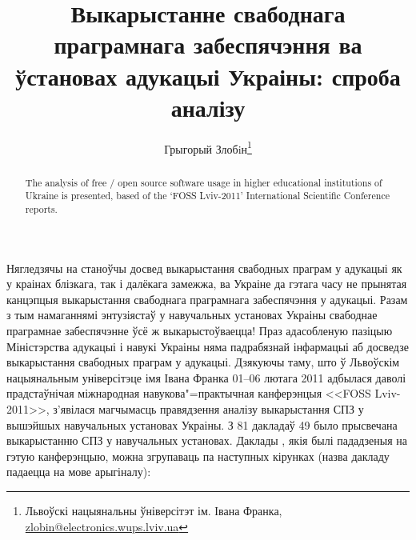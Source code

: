 \documentclass[10pt, a5paper]{article}
\begin{document}
\renewcommand{\figurename}{Рыс.} %
\renewcommand{\abstractname}{Анатацыя}
\renewcommand{\refname}{Літаратура}

\title{Выкарыстанне свабоднага праграмнага забеспячэння ва ўстановах адукацыі Украіны: спроба аналізу}

\author{Грыгорый Злобiн\footnote{Львоўскі нацыянальны ўніверсітэт ім. Івана Франка, \url{zlobin@electronics.wups.lviv.ua}}}
\date{}

\maketitle

\begin{abstract}
The analysis of free / open source software usage in higher educational institutions of Ukraine is presented, based of the `FOSS Lviv-2011'  International Scientific Conference reports. 
\end{abstract}

Нягледзячы на станоўчы досвед выкарыстання свабодных праграм у адукацыі як у краінах блізкага, так і далёкага замежжа, ва Украіне да гэтага часу не прынятая канцэпцыя выкарыстання свабоднага праграмнага забеспячэння у адукацыі. Разам з тым намаганнямі энтузіястаў у навучальных установах Украіны свабоднае праграмнае забеспячэнне ўсё ж выкарыстоўваецца! Праз адасобленую пазіцыю Міністэрства адукацыі і навукі Украіны няма падрабязнай інфармацыі аб досведзе выкарыстання свабодных праграм у адукацыі. Дзякуючы таму, што ў Львоўскім нацыянальным універсітэце імя Івана Франка 01--06 лютага 2011 адбылася даволі прадстаўнічая міжнародная навукова"=практычная канферэнцыя <<FOSS Lviv-2011>>, з'явілася магчымасць правядзення аналізу выкарыстання СПЗ у вышэйшых навучальных установах Украіны. З 81 дакладаў 49 было прысвечана выкарыстанню СПЗ у навучальных установах. Даклады \cite{fosslviv}, якія былі пададзеныя на гэтую канферэнцыю, можна згрупаваць па наступных кірунках (назва дакладу падаецца на мове арыгіналу):
\end{document}
